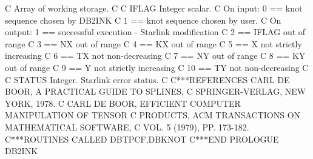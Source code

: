 \documentclass[11pt,twoside,nolof]{starlink}
\begin{document}
\begin{terminalv}
C           Array of working storage.
C
C   IFLAG   Integer scalar.
C           On input:  0 == knot sequence chosen by DB2INK
C                      1 == knot sequence chosen by user.
C           On output: 1 == successful execution - Starlink modification
C                      2 == IFLAG out of range
C                      3 == NX out of range
C                      4 == KX out of range
C                      5 == X not strictly increasing
C                      6 == TX not non-decreasing
C                      7 == NY out of range
C                      8 == KY out of range
C                      9 == Y not strictly increasing
C                     10 == TY not non-decreasing
C
C   STATUS   Integer. Starlink error status.
C
C***REFERENCES  CARL DE BOOR, A PRACTICAL GUIDE TO SPLINES,
C                 SPRINGER-VERLAG, NEW YORK, 1978.
C               CARL DE BOOR, EFFICIENT COMPUTER MANIPULATION OF TENSOR
C                 PRODUCTS, ACM TRANSACTIONS ON MATHEMATICAL SOFTWARE,
C                 VOL. 5 (1979), PP. 173-182.
C***ROUTINES CALLED  DBTPCF,DBKNOT
C***END PROLOGUE  DB2INK
\end{terminalv}

\end{document}
